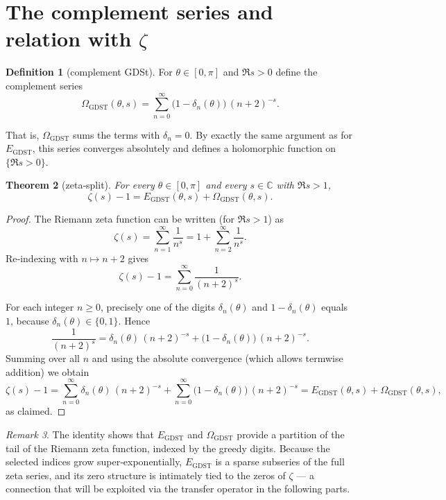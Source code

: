\documentclass[11pt,a4paper]{article}
\newtheorem{theorem}{Theorem}[section]
\theoremstyle{definition}
\newtheorem{definition}[theorem]{Definition}
\theoremstyle{remark}
\newtheorem{remark}[theorem]{Remark}
\newcommand{\C}{\mathbb{C}}
\newcommand{\GDST}{\operatorname{GDST}}
\begin{document}
\section{The complement series and relation with \(\zeta\)}\label{sec:complement}

\begin{definition}[complement GDSt]\label{def:Omega}
For \(\theta\in[0,\pi]\) and \(\Re s>0\) define the complement series
\begin{equation}\label{eq:Omega_def}
\Omega_{\GDST}(\theta,s) = \sum_{n=0}^{\infty} \bigl(1-\delta_n(\theta)\bigr)\,(n+2)^{-s}.
\end{equation}
\end{definition}
That is, \(\Omega_{\GDST}\) sums the terms with \(\delta_n=0\). By exactly the same argument as for \(E_{\GDST}\), this series converges absolutely and defines a holomorphic function on \(\{\Re s>0\}\).

\begin{theorem}[zeta‑split]\label{thm:zeta_split}
For every \(\theta\in[0,\pi]\) and every \(s\in\C\) with \(\Re s>1\),
\[
\zeta(s) - 1 = E_{\GDST}(\theta,s) + \Omega_{\GDST}(\theta,s).
\]
\end{theorem}
\begin{proof}
The Riemann zeta function can be written (for \(\Re s>1\)) as
\[
\zeta(s) = \sum_{n=1}^{\infty} \frac{1}{n^s} = 1 + \sum_{n=2}^{\infty} \frac{1}{n^s}.
\]
Re‑indexing with \(n\mapsto n+2\) gives
\[
\zeta(s)-1 = \sum_{n=0}^{\infty} \frac{1}{(n+2)^s}.
\]

For each integer \(n\ge0\), precisely one of the digits \(\delta_n(\theta)\) and \(1-\delta_n(\theta)\) equals \(1\), because \(\delta_n(\theta)\in\{0,1\}\). Hence
\[
\frac{1}{(n+2)^s} = \delta_n(\theta)\,(n+2)^{-s} + \bigl(1-\delta_n(\theta)\bigr)\,(n+2)^{-s}.
\]
Summing over all \(n\) and using the absolute convergence (which allows termwise addition) we obtain
\[
\zeta(s)-1 = \sum_{n=0}^{\infty} \delta_n(\theta)\,(n+2)^{-s} + \sum_{n=0}^{\infty} \bigl(1-\delta_n(\theta)\bigr)\,(n+2)^{-s} = E_{\GDST}(\theta,s) + \Omega_{\GDST}(\theta,s),
\]
as claimed.
\end{proof}

\begin{remark}
The identity shows that \(E_{\GDST}\) and \(\Omega_{\GDST}\) provide a partition of the tail of the Riemann zeta function, indexed by the greedy digits. Because the selected indices grow super‑exponentially, \(E_{\GDST}\) is a sparse subseries of the full zeta series, and its zero structure is intimately tied to the zeros of \(\zeta\) — a connection that will be exploited via the transfer operator in the following parts.
\end{remark}
\end{document}
